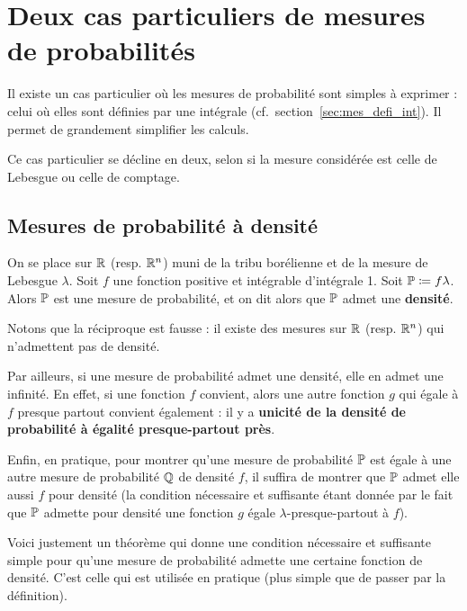 \documentclass[../integ-proba.tex]{subfiles}
\begin{document}
    \section{Deux cas particuliers de mesures de probabilités}
    \label{sec:probas_mes_particulieres}

    Il existe un cas particulier où les mesures de probabilité sont simples à exprimer : celui où elles sont définies par une intégrale (cf.\ section~\ref{sec:mes_defi_int}).
    Il permet de grandement simplifier les calculs.

    Ce cas particulier se décline en deux, selon si la mesure considérée est celle de Lebesgue ou celle de comptage.

    \subsection{Mesures de probabilité à densité}
    \begin{defi}
        On se place sur $\mathbb{R}$ (resp. $\mathbb{R}^n$) muni de la tribu borélienne et de la mesure de Lebesgue $\lambda$.
        Soit $f$ une fonction positive et intégrable d'intégrale 1.
        Soit $\mathbb{P}\coloneqq f \lambda$.
        Alors $\mathbb{P}$ est une mesure de probabilité, et on dit alors que $\mathbb{P}$ admet une \textbf{densité}.
    \end{defi}

    \begin{rem}
        Notons que la réciproque est fausse : il existe des mesures sur $\mathbb{R}$ (resp. $\mathbb{R}^n$) qui n'admettent pas de densité.

        Par ailleurs, si une mesure de probabilité admet une densité, elle en admet une infinité.
        En effet, si une fonction $f$ convient, alors une autre fonction $g$ qui égale à $f$ presque partout convient également : il y a \textbf{unicité de la densité de probabilité à égalité presque-partout près}. %

        Enfin, en pratique, pour montrer qu'une mesure de probabilité $\mathbb{P}$ est égale à une autre mesure de probabilité $\mathbb{Q}$ de densité $f$, il suffira de montrer que $\mathbb{P}$ admet elle aussi $f$ pour densité (la condition nécessaire et suffisante étant donnée par le fait que $\mathbb{P}$ admette pour densité une fonction $g$ égale $\lambda$-presque-partout à $f$).
    \end{rem}

    Voici justement un théorème qui donne une condition nécessaire et suffisante simple pour qu'une mesure de probabilité admette une certaine fonction de densité.
    C'est celle qui est utilisée en pratique (plus simple que de passer par la définition).
\end{document}
